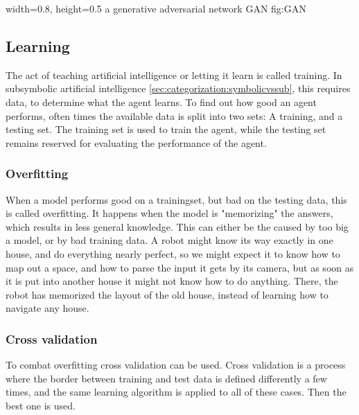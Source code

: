     {width=0.8\textwidth, height=0.5\textheight} %
    {a generative adversarial network}   %
    {GAN}   %
    {fig:GAN}    %

\subsection{Learning}
The act of teaching artificial intelligence or letting it learn is called training. In subsymbolic artificial intelligence \autoref{sec:categorization:symbolicvssub}, this requires data, to determine what the agent learns. To find out how good an agent performs, often times the available data is split into two sets: A training, and a testing set. The training set is used to train the agent, while the testing set remains reserved for evaluating the performance of the agent.

\subsubsection{Overfitting}
\label{sec:overfitting}
When a model performs good on a trainingset, but bad on the testing data, this is called overfitting. It happens when the model is "memorizing" the answers, which results in less general knowledge. This can either be the caused by too big a model, or by bad training data\cite{overfit}. A robot might know its way exactly in one house, and do everything nearly perfect, so we might expect it to know how to map out a space, and how to parse the input it gets by its camera, but as soon as it is put into another house it might not know how to do anything. There, the robot has memorized the layout of the old house, instead of learning how to navigate any house.

\subsubsection{Cross validation}
To combat overfitting cross validation can be used. Cross validation is a process where the border between training and test data is defined differently a few times, and the same learning algorithm is applied to all of these cases. Then the best one is used.